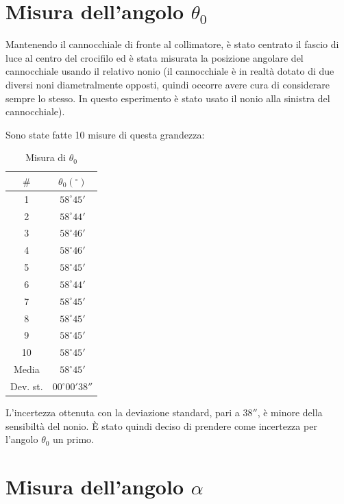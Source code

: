 \documentclass{article}
\begin{document}
\section{Misura dell'angolo $\theta _0$}

Mantenendo il cannocchiale di fronte al collimatore, è stato centrato il fascio di luce al centro del crocifilo ed è stata misurata la posizione angolare del cannocchiale usando il relativo nonio (il cannocchiale è in realtà dotato di due diversi noni diametralmente opposti, quindi occorre avere cura di considerare sempre lo stesso. In questo esperimento è stato usato il nonio alla sinistra del cannocchiale).

Sono state fatte 10 misure di questa grandezza:

\vspace{5mm}

\begin{table}[h!]
\centering
\begin{tabular}{ | c | c | }
  \hline
   $\#$ & $\theta _0 (^{\circ})$ \\
  \hline
  1 & $58^{\circ} 45'$ \\
  2 & $58^{\circ} 44'$ \\
  3 & $58^{\circ} 46'$ \\
  4 & $58^{\circ} 46'$ \\
  5 & $58^{\circ} 45'$ \\
  6 & $58^{\circ} 44'$ \\
  7 & $58^{\circ} 45'$ \\
  8 & $58^{\circ} 45'$ \\
  9 & $58^{\circ} 45'$ \\
  10 & $58^{\circ} 45'$ \\
  \hline
  Media & $58^{\circ} 45'$ \\
  Dev. st. & $00^{\circ} 00' 38''$ \\
  \hline
\end{tabular}
  \caption{Misura di $\theta _0$}
  \label{table:1}
\end{table}

L'incertezza ottenuta con la deviazione standard, pari a $38''$, è minore della sensibiltà del nonio. È stato quindi deciso di prendere come incertezza per l'angolo $\theta _0$ un primo.

\section{Misura dell'angolo $\alpha$}
\end{document}
